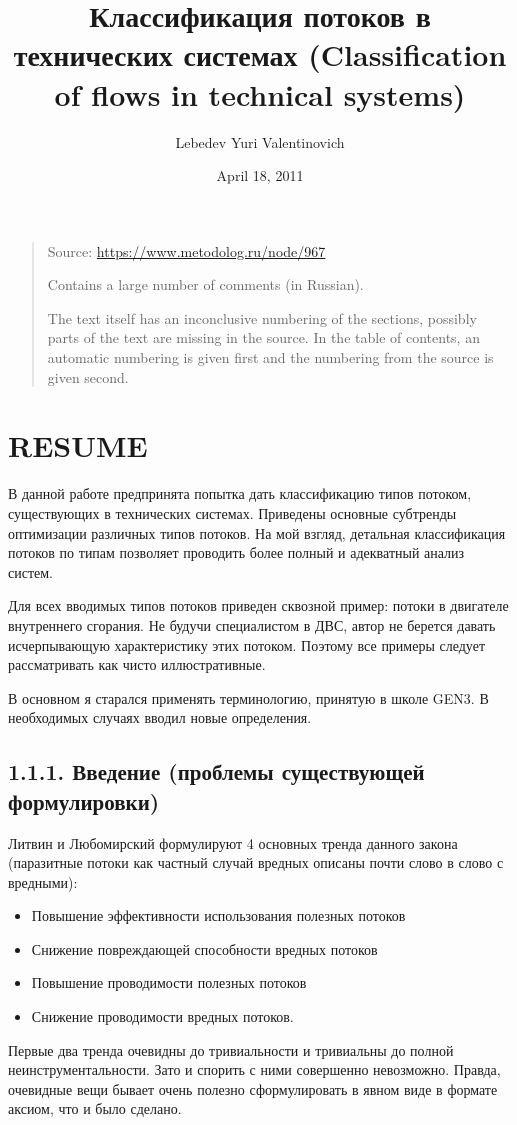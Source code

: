 \documentclass[a4paper,11pt]{article}
\author{Lebedev Yuri Valentinovich}
\title{Классификация потоков в технических системах
  (Classification of flows in technical systems)}
\date{April 18, 2011}
\begin{document}
\maketitle

\begin{quote}
  Source: \url{https://www.metodolog.ru/node/967}
  
  Contains a large number of comments (in Russian).

  The text itself has an inconclusive numbering of the sections, possibly
  parts of the text are missing in the source. In the table of contents, an
  automatic numbering is given first and the numbering from the source is
  given second.
\end{quote}

\tableofcontents

\section{RESUME}

В данной работе предпринята попытка дать классификацию типов потоком,
существующих в технических системах. Приведены основные субтренды оптимизации
различных типов потоков. На мой взгляд, детальная классификация потоков по
типам позволяет проводить более полный и адекватный анализ систем.

Для всех вводимых типов потоков приведен сквозной пример: потоки в двигателе
внутреннего сгорания. Не будучи специалистом в ДВС, автор не берется давать
исчерпывающую характеристику этих потоком. Поэтому все примеры следует
рассматривать как чисто иллюстративные.

В основном я старался применять терминологию, принятую в школе GEN3. В
необходимых случаях вводил новые определения.

\subsection{1.1.1. Введение (проблемы существующей формулировки)}

Литвин и Любомирский формулируют 4 основных тренда данного закона (паразитные
потоки как частный случай вредных описаны почти слово в слово с вредными):
\begin{itemize}
\item Повышение эффективности использования полезных потоков
\item Снижение повреждающей способности вредных потоков
\item Повышение проводимости полезных потоков
\item Снижение проводимости вредных потоков.
\end{itemize}
Первые два тренда очевидны до тривиальности и тривиальны до полной
неинструментальности. Зато и спорить с ними совершенно невозможно. Правда,
очевидные вещи бывает очень полезно сформулировать в явном виде в формате
аксиом, что и было сделано.
\end{document}
